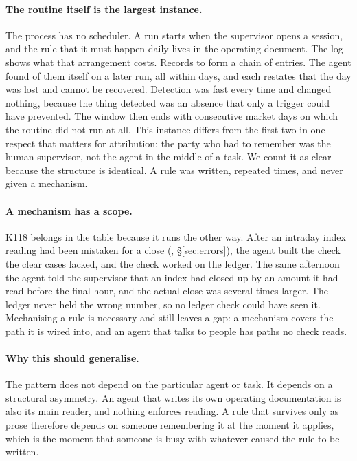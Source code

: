 \documentclass[11pt,a4paper]{article}
\begin{document}
\paragraph{The routine itself is the largest instance.} The process has no
scheduler. A run starts when the supervisor opens a session, and the rule that
it must happen daily lives in the operating document. The log shows what that
arrangement costs. Records \SkipChainFirst{} to \SkipChainLast{} form a chain
of \SkipChainN{} entries. The agent found \SkipChainAgent{} of them itself on
a later run, all within \SkipChainLatMax{} days, and each restates that the day
was lost and cannot be recovered. Detection was fast every time and changed nothing, because the
thing detected was an absence that only a trigger could have prevented. The
window then ends with \MissRunEnd{} consecutive market days on which the
routine did not run at all. This instance differs from the first two in one
respect that matters for attribution: the party who had to remember was the
human supervisor, not the agent in the middle of a task. We count it as clear
because the structure is identical. A rule was written, repeated
\SkipChainN{} times, and never given a mechanism.

\paragraph{A mechanism has a scope.} K118 belongs in the table because it runs
the other way. After an intraday index reading had been mistaken for a close
(\LatSecondRecord, \S\ref{sec:errors}), the agent built the check the clear
cases lacked, and the check worked on the ledger. The same afternoon the agent
told the supervisor that an index had closed up by an amount it had read
before the final hour, and the actual close was several times larger. The
ledger never held the wrong number, so no ledger check could have seen it.
Mechanising a rule is necessary and still leaves a gap: a mechanism covers the
path it is wired into, and an agent that talks to people has paths no check
reads.

\paragraph{Why this should generalise.} The pattern does not depend on the
particular agent or task. It depends on a structural asymmetry. An agent that
writes its own operating documentation is also its main reader, and nothing
enforces reading. A rule that survives only as prose therefore depends on
someone remembering it at the moment it applies, which is the moment that
someone is busy with whatever caused the rule to be written.
\end{document}
